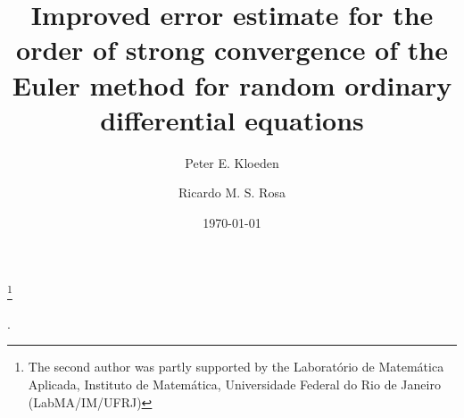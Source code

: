 \documentclass[reqno,12pt]{amsart}
\theoremstyle{plain} %
\theoremstyle{definition} %
\begin{document}


\title[Strong convergence of the Euler method for Random ODEs]{Improved error estimate for the order of strong convergence of the Euler method for random ordinary differential equations}

\author[P. E. Kloeden]{Peter E. Kloeden}
\author[R. M. S. Rosa]{Ricardo M. S. Rosa}

\address[Peter E. Kloeden]{Mathematics Department, University of Tubingen, Germany}
\address[Ricardo M. S. Rosa]{Instituto de Matem\'atica, Universidade Federal do Rio de Janeiro, Brazil}


\date{\today}

\thanks{The second author was partly supported by the Laborat\'orio de Matem\'atica Aplicada, Instituto de Matem\'atica, Universidade Federal do Rio de Janeiro (LabMA/IM/UFRJ)}

\makeatletter
{}
\makeatother
{}

.
\end{document}
